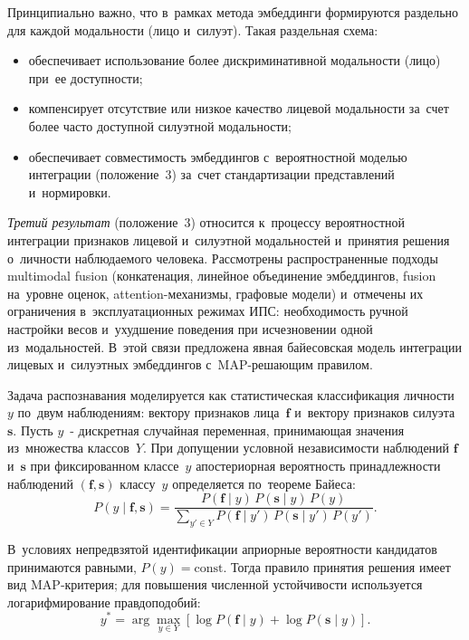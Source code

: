 Принципиально важно, что в~рамках метода эмбеддинги формируются раздельно
для каждой модальности (лицо и~силуэт). Такая раздельная схема:
\begin{itemize}
    \item обеспечивает использование более дискриминативной модальности
          (лицо) при~ее доступности;
    \item компенсирует отсутствие или низкое качество лицевой модальности
          за~счет более часто доступной силуэтной модальности;
    \item обеспечивает совместимость эмбеддингов с~вероятностной моделью
          интеграции (положение~3) за~счет стандартизации представлений
          и~нормировки.
\end{itemize}

\textit{Третий результат} (положение~3) относится к~процессу вероятностной
интеграции признаков лицевой и~силуэтной модальностей и~принятия решения
о~личности наблюдаемого человека. Рассмотрены распространенные
подходы multimodal fusion (конкатенация, линейное объединение эмбеддингов,
fusion на~уровне оценок, attention-механизмы, графовые модели) и~отмечены
их ограничения в~эксплуатационных режимах ИПС: необходимость ручной настройки
весов и~ухудшение поведения при исчезновении одной из~модальностей. В~этой
связи предложена явная байесовская модель интеграции лицевых и~силуэтных
эмбеддингов с~MAP-решающим правилом.

Задача распознавания моделируется как статистическая классификация
личности~$y$ по~двум наблюдениям: вектору признаков лица~$\mathbf{f}$
и~вектору признаков силуэта~$\mathbf{s}$. Пусть $y$~- дискретная случайная
переменная, принимающая значения из~множества классов~$Y$. При допущении
условной независимости наблюдений $\mathbf{f}$ и~$\mathbf{s}$ при
фиксированном классе~$y$ апостериорная вероятность принадлежности
наблюдений $(\mathbf{f},\mathbf{s})$ классу~$y$ определяется по~теореме
Байеса:
\begin{equation}
    P(y\mid \mathbf{f},\mathbf{s})=
    \frac{P(\mathbf{f}\mid y)\,P(\mathbf{s}\mid y)\,P(y)}
    {\sum\limits_{y'\in Y}P(\mathbf{f}\mid y')\,P(\mathbf{s}\mid y')\,P(y')}.
    \label{eq:bayes}
\end{equation}

В~условиях непредвзятой идентификации априорные вероятности кандидатов
принимаются равными, $P(y)=\mathrm{const}$. Тогда правило принятия решения
имеет вид MAP‑критерия; для повышения численной устойчивости используется
логарифмирование правдоподобий:
\begin{equation}
    y^*=\arg\max\limits_{y\in Y}
    \left[\log P(\mathbf{f}\mid y)+\log P(\mathbf{s}\mid y)\right].
    \label{eq:map}
\end{equation}


